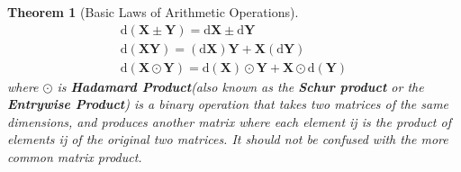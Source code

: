 \documentclass{article}
\newcommand{\Differential}{\ensuremath{\mathrm{d}}}
\newcommand{\MatrixSymbol}[1]{\ensuremath{{\boldsymbol{#1}}}}
\newcommand{\MatrixX}{\MatrixSymbol{X}}
\newcommand{\MatrixY}{\MatrixSymbol{Y}}
\newtheorem{Theorem}{Theorem}[section]
\theoremstyle{nonumberplain}
\begin{document}
\begin{Theorem}[Basic Laws of Arithmetic Operations]
    \begin{gather}
        \Differential (\MatrixX\pm\MatrixY)=\Differential\MatrixX\pm\Differential\MatrixY\\
        \Differential(\MatrixX\MatrixY)=(\Differential\MatrixX)\MatrixY+\MatrixX(\Differential\MatrixY)\\
        \Differential(\MatrixX\odot\MatrixY)=\Differential(\MatrixX)\odot\MatrixY+\MatrixX\odot\Differential(\MatrixY)
    \end{gather}
    where $\odot$ is \textbf{Hadamard Product}(also known as the \textbf{Schur product} or the \textbf{Entrywise Product}) is a binary operation that takes two matrices of the same dimensions, and produces another matrix where each element ij is the product of elements ij of the original two matrices. It should not be confused with the more common matrix product.
\end{Theorem}
\end{document}
